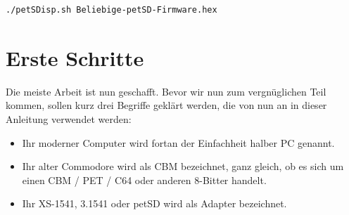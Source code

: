 \documentclass[10pt,a4paper]{scrartcl}		%
\begin{document}
\begin{verbatim}
./petSDisp.sh Beliebige-petSD-Firmware.hex
\end{verbatim}

\clearpage
\section{Erste Schritte}
Die meiste Arbeit ist nun geschafft. Bevor wir nun zum vergnüglichen
Teil kommen, sollen kurz drei Begriffe geklärt werden, die von nun
an in dieser Anleitung verwendet werden:
\begin{itemize}
\item Ihr moderner Computer wird fortan der Einfachheit halber
	\glqq{}PC\grqq{} genannt. 
\item Ihr alter Commodore wird als 
\glqq{}CBM\grqq{} bezeichnet, ganz gleich, ob es sich um einen CBM / PET / C64 
oder anderen 8-Bitter handelt.
   
\item Ihr XS-1541, 3.1541 oder petSD wird 
als \glqq{}Adapter\grqq{} bezeichnet.
\end{itemize}
\end{document}
